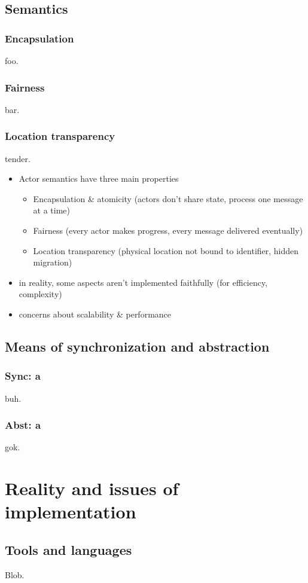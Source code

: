 \documentclass[A4]{article}
\begin{document}
\subsection{Semantics}
\subsubsection{Encapsulation}
foo.
\subsubsection{Fairness}
bar.
\subsubsection{Location transparency}
tender.
\begin{itemize}
\item Actor semantics have three main properties
	\begin{itemize}
	\item Encapsulation \& atomicity
	(actors don't share state, process one message at a time)
	\item Fairness
	(every actor makes progress, every message delivered eventually)
	\item Location transparency
	(physical location not bound to identifier, hidden migration)
	\end{itemize}
\item in reality, some aspects aren't implemented faithfully (for efficiency, complexity)
\item concerns about scalability \& performance
\end{itemize}
\subsection{Means of synchronization and abstraction}
\subsubsection{Sync: a}
buh.
\subsubsection{Abst: a}
gok.

\section{Reality and issues of implementation}
\subsection{Tools and languages}
Blob.
\end{document}
